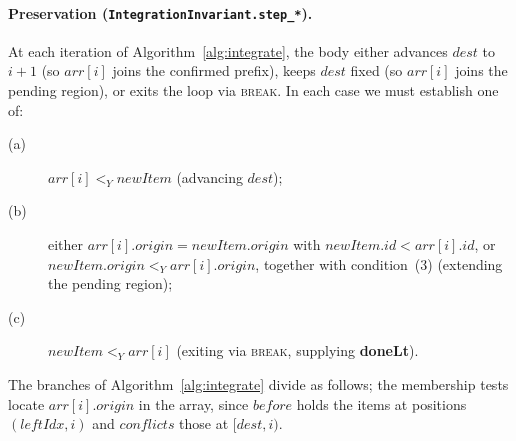 \documentclass[sigplan,screen]{acmart}
\newcommand{\leanref}[1]{\texttt{#1}}
\newcommand{\YjsLt}{\mathrel{<_Y}}
\begin{document}
\paragraph{Preservation (\leanref{IntegrationInvariant.step\_*}).}
At each iteration of Algorithm~\ref{alg:integrate}, the body either
advances $\mathit{dest}$ to $i+1$ (so $\mathit{arr}[i]$ joins the
confirmed prefix), keeps $\mathit{dest}$ fixed (so $\mathit{arr}[i]$
joins the pending region), or exits the loop via \textsc{break}.  In
each case we must establish one of:
\begin{description}
\item[(a)] $\mathit{arr}[i] \YjsLt \mathit{newItem}$
  (advancing $\mathit{dest}$);
\item[(b)] either
  $\mathit{arr}[i].\mathit{origin} = \mathit{newItem}.\mathit{origin}$
  with $\mathit{newItem}.\mathit{id} < \mathit{arr}[i].\mathit{id}$, or
  $\mathit{newItem}.\mathit{origin} \YjsLt
  \mathit{arr}[i].\mathit{origin}$, together with condition~(3)
  (extending the pending region);
\item[(c)] $\mathit{newItem} \YjsLt \mathit{arr}[i]$
  (exiting via \textsc{break}, supplying \textbf{doneLt}).
\end{description}
The branches of Algorithm~\ref{alg:integrate} divide as follows; the
membership tests locate $\mathit{arr}[i].\mathit{origin}$ in the
array, since $\mathit{before}$ holds the items at positions
$(\mathit{leftIdx}, i)$ and $\mathit{conflicts}$ those at
$[\mathit{dest}, i)$.
\end{document}
